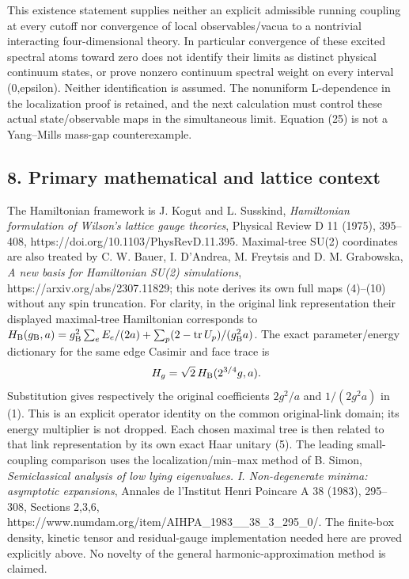 \documentclass[
  11pt,
]{article}
\begin{document}
This existence statement supplies neither an explicit admissible running
coupling at every cutoff nor convergence of local observables/vacua to a
nontrivial interacting four-dimensional theory. In particular
convergence of these excited spectral atoms toward zero does not
identify their limits as distinct physical continuum states, or prove
nonzero continuum spectral weight on every interval (0,epsilon). Neither
identification is assumed. The nonuniform L-dependence in the
localization proof is retained, and the next calculation must control
these actual state/observable maps in the simultaneous limit. Equation
(25) is not a Yang--Mills mass-gap counterexample.

\subsection{8. Primary mathematical and lattice
context}\label{weak-coupling-part-1-primary-mathematical-and-lattice-context}

The Hamiltonian framework is J. Kogut and L. Susskind, \emph{Hamiltonian
formulation of Wilson's lattice gauge theories}, Physical Review D 11
(1975), 395--408, https://doi.org/10.1103/PhysRevD.11.395. Maximal-tree
SU(2) coordinates are also treated by C. W. Bauer, I. D'Andrea, M.
Freytsis and D. M. Grabowska, \emph{A new basis for Hamiltonian SU(2)
simulations}, https://arxiv.org/abs/2307.11829; this note derives its
own full maps (4)--(10) without any spin truncation. For clarity, in the
original link representation their displayed maximal-tree Hamiltonian
corresponds to \(H_{\rm B}(g_{\rm B},a)=g_{\rm B}^2\sum_eE_e/(2a)
+\sum_p(2-\operatorname{tr}U_p)/(g_{\rm B}^2a)\). The exact
parameter/energy dictionary for the same edge Casimir and face trace is
\[
 H_g=\sqrt2\,H_{\rm B}(2^{3/4}g,a).
\] Substitution gives respectively the original coefficients \(2g^2/a\)
and \(1/(2g^2a)\) in (1). This is an explicit operator identity on the
common original-link domain; its energy multiplier is not dropped. Each
chosen maximal tree is then related to that link representation by its
own exact Haar unitary (5). The leading small-coupling comparison uses
the localization/min--max method of B. Simon, \emph{Semiclassical
analysis of low lying eigenvalues. I. Non-degenerate minima: asymptotic
expansions}, Annales de l'Institut Henri Poincare A 38 (1983), 295--308,
Sections 2,3,6,
https://www.numdam.org/item/AIHPA\_1983\_\_38\_3\_295\_0/. The
finite-box density, kinetic tensor and residual-gauge implementation
needed here are proved explicitly above. No novelty of the general
harmonic-approximation method is claimed.
\end{document}
